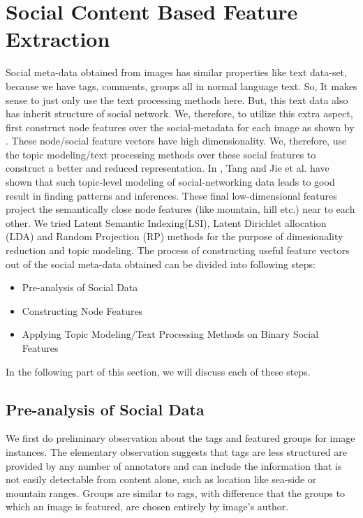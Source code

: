 \section{Social Content Based Feature Extraction}
Social meta-data obtained from images has similar properties like text data-set, because we have tags, comments, groups all in normal language text. So, It makes sense to just only use the text processing methods here. But, this text data also has inherit structure of social network. We, therefore, to utilize this extra aspect, first construct node features over the social-metadata for each image as shown by \cite{Jure}. These node/social feature vectors have high dimensionality. We, therefore, use the topic modeling/text processing methods over these social features to construct a better and reduced representation. In \cite{tang}, Tang and Jie et al. have shown that such topic-level modeling of social-networking data leads to good result in finding patterns and inferences. These final low-dimensional features project the semantically close node features (like mountain, hill etc.) near to each other. We tried Latent Semantic Indexing(LSI), Latent Dirichlet allocation (LDA) and Random Projection (RP) methods for the purpose of dimesionality reduction and topic modeling. 
The process of constructing useful feature vectors out of the social meta-data obtained can be divided into following steps:\\
\begin{itemize}
\item Pre-analysis of Social Data
\item Constructing Node Features
\item Applying Topic Modeling/Text Processing Methods on Binary Social Features
\end{itemize} 
In the following part of this section, we will discuss each of these steps.
\subsection{Pre-analysis of Social Data}
   We first do preliminary observation about the tags and featured groups for image instances. The elementary observation suggests that tags are less structured are provided by any number of annotators and can include the information that is not easily detectable from content alone, such as location like sea-side or mountain ranges. Groups are similar to rags, with difference that the groups to which an image is featured, are chosen entirely by image's author.


